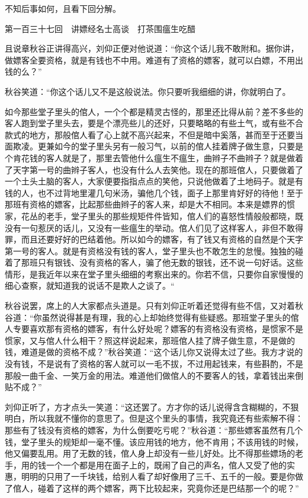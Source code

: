 \documentclass[12pt,UTF8]{ctexbook}
\begin{document}
{{{不知后事如何，且看下回分解。





第一百三十七回　讲嫖经名士高谈　打茶围瘟生吃醋





且说章秋谷正讲得高兴，刘仰正便对他说道：“你这个话儿我不敢附和。据你讲，做嫖客全要资格，就是有钱也不中用。难道有了资格的嫖客，就可以白嫖，不用出钱的么？”

秋谷笑道：“你这个话儿又不是这般说法。你只要听我细细的讲，你就明白了。

如今那些堂子里头的倌人，一个个都是精灵古怪的，那里还比得从前？差不多些的客人跑到堂子里头去，要是个漂亮些儿的还好，只要略略的有些土气，或有些不合款式的地方，那般倌人看了心上就不高兴起来，不但是暗中奚落，甚而至于还要当面欺凌。更兼如今的堂子里头另有一般习气，以前的倌人挂着牌子做生意，只要是个肯花钱的客人就是了，那里去管他什么瘟生不瘟生，曲辫子不曲辫子？就是做着了天字第一号的曲辫子客人，也没有什么人去笑他。现在的那班倌人，只要做着了一个土头土脑的客人，大家便要指指点点的笑他，只说他做着了土地码子。就是有钱的人，也不过背地里灌几句米汤，骗他几个钱，面子上那里肯好好的待他！至于那班有资格的嫖客，比起那些曲辫子的客人来，却是大不相同。本来是嫖界的惯家，花丛的老手，堂子里头的那些规矩件件皆知，倌人们的喜怒性情般般都晓，既没有一句惹厌的话儿，又没有一些瘟生的举动。倌人们见了这样客人，非但不敢得罪，而且还要好好的巴结着他。所以如今的嫖客，有了钱又有资格的自然是个天字第一号的客人。就是有资格没有钱的客人，堂子里头也不敢怎生的怠慢。独独的碰着了那班只有银钱、没有资格的客人，骗了他无数的银钱，还不说一句好话。这些情形，是我近年以来在堂子里头细细的考察出来的。你若不信，只要你自家慢慢的细心查察，就知道我的说话不是欺人之谈了。“

秋谷说罢，席上的人大家都点头道是。只有刘仰正听着还觉得有些不信，又对着秋谷道：“你虽然说得甚是有理，我的心上却始终觉得有些疑惑。那班堂子里头的倌人专要喜欢那有资格的嫖客，有什么好处呢？嫖客的有资格没有资格，是惯家不是惯家，又与倌人什么相干？照这样说起来，那班倌人挂了牌子做生意，不是做的钱，难道是做的资格不成？”秋谷笑道：“这个话儿你又说得太过了些。我方才说的没有钱，不是说有了资格的客人就可以一毛不拔，不过用起钱来，有些斟酌，不是那般一曲千金、一笑万金的用法。难道他们做倌人的不要客人的钱，拿着钱出来倒贴不成？”

刘仰正听了，方才点头一笑道：“这还罢了。方才你的话儿说得含含糊糊的，不狠明白，所以我就不懂你的意思了。但是这个里头的事情，我究竟还有些索解不得：那些有了钱没有资格的嫖客，为什么倒要吃亏呢？”秋谷道：“那些嫖客虽然有几个钱，堂子里头的规矩却一毫不懂。该应用钱的地方，他不肯用；不该用钱的时候，他又偏要乱用。用了无数的钱，倌人身上却没有一些儿好处。比不得那些嫖场的老手，用的钱一个一个都是用在面子上的，既闹了自己的声名，倌人又受了他的实惠，明明的只用了一千块钱，给别人看了却好像用了三千、五千的一般。要是你做了倌人，碰着了这样的两个嫖客，两下比较起来，究竟你还是巴结那一个的呢？”

}}}
\end{document}
